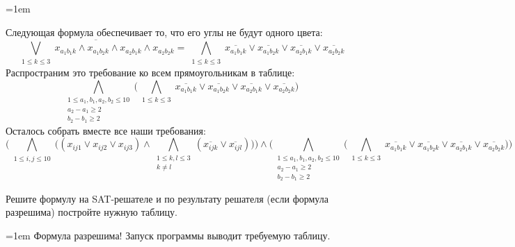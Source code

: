 \documentclass[12pt]{extreport}
\theoremstyle{definiton}
\theoremstyle{definition}
\theoremstyle{definition}
\let\leq\leqslant
\let\geq\geqslant
\newcommand{\solution}[2][\color{myblue}Решение]{
\medskip
	\noindent{\bfseries #1 }{{\color{myblue}\bfseries #2:}}
}
\newenvironment{blockquote}{%
  \par%
  \medskip
  \leftskip=1em%
  \noindent}{%
  \par\medskip}
\begin{document}
\begin{blockquote}
{\begin{center}
    \end{center}
    Следующая формула обеспечивает то, что его углы не будут одного цвета:
    $$\overline{\bigvee\limits_{\substack{1 \leq k \leq 3}}x_{a_1b_1k} \wedge x_{a_1b_2k} \wedge x_{a_2b_1k} \wedge x_{a_2b_2k}} = \bigwedge\limits_{\substack{1 \leq k \leq 3}}\overline{x_{a_1b_1k}} \vee \overline{x_{a_1b_2k}} \vee \overline{x_{a_2b_1k}} \vee \overline{x_{a_2b_2k}}$$
    Распространим это требование ко всем прямоугольникам в таблице:
    $$\bigwedge\limits_{\substack{1 \leq a_1, b_1, a_2, b_2 \leq 10\\a_2 - a_1 \geq 2 \\b_2 - b_1 \geq 2}}\Big(\bigwedge\limits_{\substack{1 \leq k \leq 3}}\overline{x_{a_1b_1k}} \vee \overline{x_{a_1b_2k}} \vee \overline{x_{a_2b_1k}} \vee \overline{x_{a_2b_2k}}\Big)$$
    Осталось собрать вместе все наши требования:
    $$\Bigg(\bigwedge\limits_{\substack{1 \leq i, j \leq 10}} \Big((x_{ij1} \vee x_{ij2} \vee x_{ij3}) \wedge \bigwedge\limits_{\substack{1 \leq k, l \leq 3 \\ k \neq l}} (\overline{x_{ijk}} \vee \overline{x_{ijl}}) \Big)\Bigg) \wedge \Bigg(\bigwedge\limits_{\substack{1 \leq a_1, b_1, a_2, b_2 \leq 10\\a_2 - a_1 \geq 2 \\b_2 - b_1 \geq 2}}\Big(\bigwedge\limits_{\substack{1 \leq k \leq 3}}\overline{x_{a_1b_1k}} \vee \overline{x_{a_1b_2k}} \vee \overline{x_{a_2b_1k}} \vee \overline{x_{a_2b_2k}}\Big)\Bigg)$$

    }
    \end{blockquote}

\Pr[10 баллов] Решите формулу на SAT-решателе и по результату решателя (если формула разрешима) постройте нужную таблицу.

    \solution{6}
    \begin{blockquote}
    {\color{myblue}
    \noindent Формула разрешима! Запуск программы {} выводит требуемую таблицу.
    }
    \end{blockquote}
			
			
\end{document}
